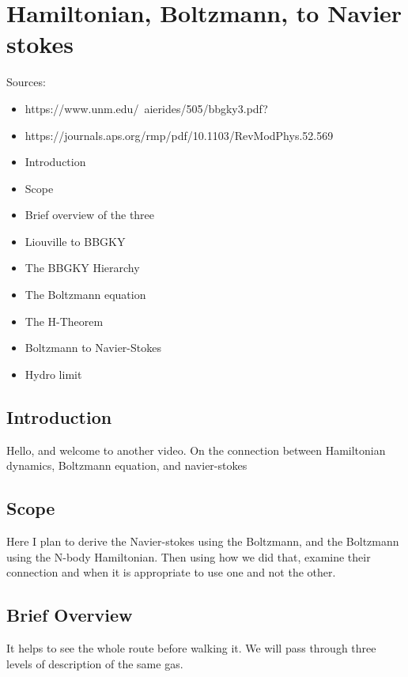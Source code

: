 \section{Hamiltonian, Boltzmann, to Navier stokes}

Sources:
\begin{itemize}
  \item https://www.unm.edu/~aierides/505/bbgky3.pdf?
  \item https://journals.aps.org/rmp/pdf/10.1103/RevModPhys.52.569
\end{itemize}

\begin{itemize}
  \item Introduction
  \item Scope
  \item Brief overview of the three
  \item Liouville to BBGKY
  \item The BBGKY Hierarchy
  \item The Boltzmann equation
  \item The H-Theorem
  \item Boltzmann to Navier-Stokes
  \item Hydro limit
\end{itemize}

\subsection{Introduction}

Hello, and welcome to another video. On the connection between Hamiltonian dynamics, Boltzmann equation, and navier-stokes

\subsection{Scope}

Here I plan to derive the Navier-stokes using the Boltzmann, and the Boltzmann using the N-body Hamiltonian. Then using how we did that, examine their connection and when it is appropriate to use one and not the other.


\subsection{Brief Overview}
It helps to see the whole route before walking it. We will pass through three levels of description of the same gas.

